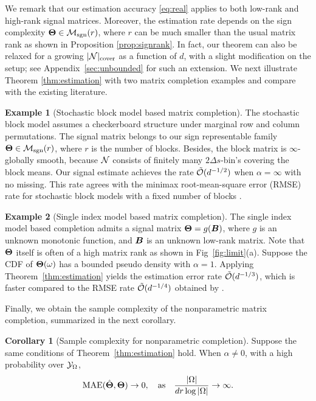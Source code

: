 \documentclass[aos]{imsart}
\theoremstyle{definition}
\newtheorem{corollary}{Corollary}
\newtheorem{example}{Example}
\def\caliM{\tM_{\textup{sgn}}}
\begin{document}
\noindent
We remark that our estimation accuracy \eqref{eq:real} applies to both low-rank and high-rank signal matrices. Moreover, the estimation rate depends on the sign complexity $\mTheta\in\caliM(r)$, where $r$ can be much smaller than the usual matrix rank as shown in Proposition \ref{prop:signrank}. In fact, our theorem can also be relaxed for a growing $|\mathcal{N}|_{\text{cover}}$ as a function of $d$, with a slight modification on the setup; see Appendix~\ref{sec:unbounded}  for such an extension. We next illustrate Theorem \ref{thm:estimation} with two matrix completion examples and compare with the existing literature.  

\begin{example}[Stochastic block model based matrix completion]
The stochastic block model \cite{chi2020provable} assumes a checkerboard structure under marginal row and column permutations. The signal matrix belongs to our sign representable family $\mTheta \in \caliM(r)$, where $r$ is the number of blocks. Besides, the block matrix is $\infty$-globally smooth, because $\mathcal{N}$ consists of finitely many $2\Delta s$-bin's covering the block means. Our signal estimate achieves the rate $\tilde {\mathcal{O}}(d^{-1/2})$ when $\alpha=\infty$ with no missing. This rate agrees with the minimax root-mean-square error (RMSE) rate for stochastic block models with a fixed number of blocks \cite{gao2016optimal}. 
\end{example}

\begin{example}[Single index model based matrix completion]
The single index model based completion \cite{ganti2015matrix} admits a signal matrix $\bm{\Theta}=g(\bm B)$, where $g$ is an unknown monotonic function, and $\bm B$ is an unknown low-rank matrix. Note that $\bm{\Theta}$ itself is often of a high matrix rank as shown in Fig~\ref{fig:limit}(a). Suppose the CDF of $\bm{\Theta}(\omega)$ has a bounded pseudo density with $\alpha=1$. Applying Theorem~\ref{thm:estimation} yields the estimation error rate $\tilde {\mathcal{O}}(d^{-1/3})$, which is faster compared to the RMSE rate $\tilde {\mathcal{O}}(d^{-1/4})$ obtained by \cite{ganti2015matrix}. 
\end{example}

Finally, we obtain the sample complexity of the nonparametric matrix completion, summarized in the next corollary.

\begin{corollary}[Sample complexity for nonparametric completion] \label{thm:sample-complexity}
Suppose the same conditions of Theorem~\ref{thm:estimation} hold. When $\alpha\neq 0$, with a high probability over $\mathcal{Y}_\Omega$, 
\begin{equation*}
\textup{MAE}(\hat \mTheta, \mTheta)\to 0, \quad \text{as}\quad {|\Omega|\over {d} r \log|\Omega|}\to \infty.
\end{equation*}
\end{corollary}
\end{document}
